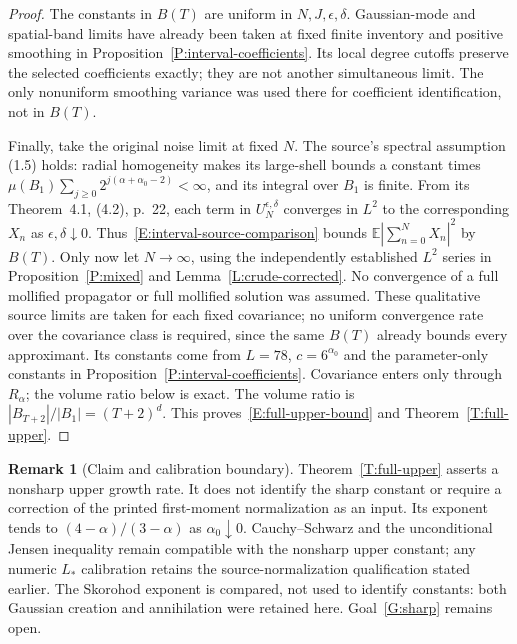 \documentclass[12pt]{article}
\numberwithin{equation}{section}
\theoremstyle{definition}
\newtheorem{remark}[theorem]{Remark}
\newcommand{\E}{\mathbb{E}}
\begin{document}
\begin{proof}
  The constants in $B(T)$ are uniform in $N,J,\epsilon,\delta$.
  Gaussian-mode and spatial-band limits have already been taken at fixed
  finite inventory and positive smoothing in
  Proposition~\ref{P:interval-coefficients}. Its local degree cutoffs
  preserve the selected coefficients exactly; they are not another
  simultaneous limit. The only nonuniform smoothing variance was used
  there for coefficient identification, not in $B(T)$.

  Finally, take the original noise limit at fixed $N$. The source's
  spectral assumption (1.5) holds: radial homogeneity makes its large-shell
  bounds a constant times
  $\mu(B_1)\sum_{j\ge0}2^{j(\alpha+\alpha_0-2)}<\infty$,
  and its integral over $B_1$ is finite. From its
  Theorem~4.1, (4.2), p.~22, each term in $U_N^{\epsilon,\delta}$
  converges in $L^2$ to the corresponding $X_n$ as
  $\epsilon,\delta\downarrow0$. Thus~\eqref{E:interval-source-comparison}
  bounds $\E|\sum_{n=0}^N X_n|^2$ by $B(T)$.
  Only now let $N\to\infty$, using the independently established
  $L^2$ series in Proposition~\ref{P:mixed} and
  Lemma~\ref{L:crude-corrected}. No convergence of a full mollified
  propagator or full mollified solution was assumed.
  These qualitative source limits are taken for each fixed covariance;
  no uniform convergence rate over the covariance class is required,
  since the same $B(T)$ already bounds every approximant.
  Its constants come from $L=78$, $c=6^{\alpha_0}$ and the parameter-only
  constants in Proposition~\ref{P:interval-coefficients}. Covariance enters
  only through $R_\alpha$; the volume ratio below is exact.
  The volume ratio is $|B_{T+2}|/|B_1|=(T+2)^d$.
  This proves~\eqref{E:full-upper-bound} and
  Theorem~\ref{T:full-upper}.
\end{proof}

\begin{remark}[Claim and calibration boundary]\label{R:full-upper-boundary}
  Theorem~\ref{T:full-upper} asserts a nonsharp upper growth rate.
  It does not identify the sharp constant or require a correction of the
  printed first-moment normalization as an input.
  Its exponent tends to $(4-\alpha)/(3-\alpha)$ as $\alpha_0\downarrow0$.
  Cauchy--Schwarz and the unconditional Jensen inequality remain compatible
  with the nonsharp upper constant; any numeric $L_*$ calibration retains
  the source-normalization qualification stated earlier.
  The Skorohod exponent is compared, not used to identify constants:
  both Gaussian creation and annihilation were retained here.
  Goal~\ref{G:sharp} remains open.
\end{remark}
\end{document}
